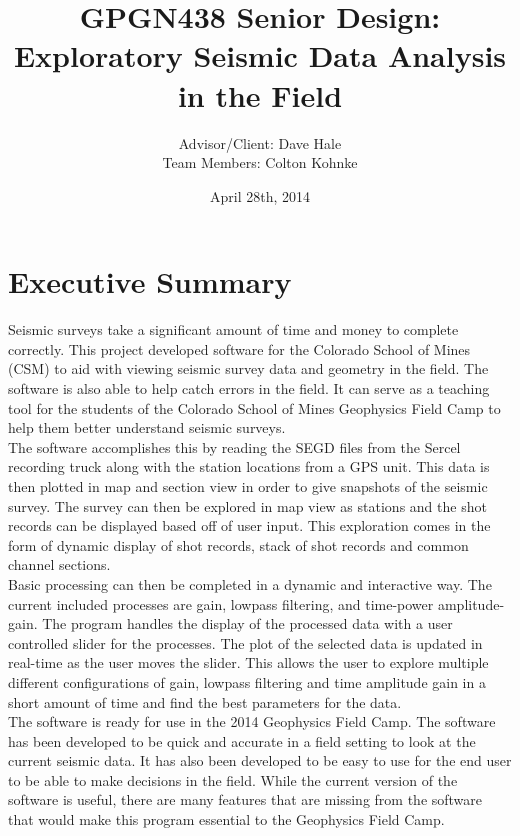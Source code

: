\documentclass[12pt]{article}
\author{Advisor/Client: Dave Hale \\ Team Members: Colton Kohnke}
\title{GPGN438 Senior Design: \\ Exploratory Seismic Data Analysis in the Field}
\date{April 28th, 2014}
\begin{document}
\maketitle
\newpage

\section{Executive Summary}

Seismic surveys take a significant amount of time and money to complete correctly. This project developed software for the Colorado School of Mines (CSM) to aid with viewing seismic survey data and geometry in the field. The software is also able to help catch errors in the field. It can serve as a teaching tool for the students of the Colorado School of Mines Geophysics Field Camp to help them better understand seismic surveys. \\

The software accomplishes this by reading the SEGD files from the Sercel recording truck along with the station locations from a GPS unit. This data is then plotted in map and section view in order to give snapshots of the seismic survey. The survey can then be explored in map view as stations and the shot records can be displayed based off of user input. This exploration comes in the form of dynamic display of shot records, stack of shot records and common channel sections.\\

Basic processing can then be completed in a dynamic and interactive way. The current included processes are gain, lowpass filtering, and time-power amplitude-gain. The program handles the display of the processed data with a user controlled slider for the processes. The plot of the selected data is updated in real-time as the user moves the slider. This allows the user to explore multiple different configurations of gain, lowpass filtering and time amplitude gain in a short amount of time and find the best parameters for the data.\\

The software is ready for use in the 2014 Geophysics Field Camp. The software has been developed to be quick and accurate in a field setting to look at the current seismic data. It has also been developed to be easy to use for the end user to be able to make decisions in the field. While the current version of the software is useful, there are many features that are missing from the software that would make this program essential to the Geophysics Field Camp. 
\end{document}
